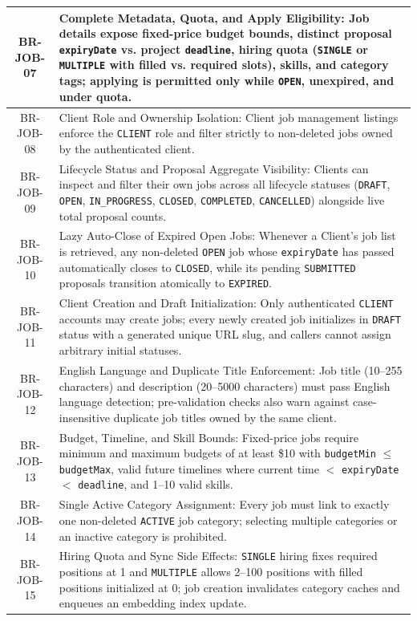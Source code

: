 \begin{longtable}{|c|p{12cm}|}
    BR-JOB-07 & Complete Metadata, Quota, and Apply Eligibility: Job details expose fixed-price budget bounds, distinct proposal \texttt{expiryDate} vs. project \texttt{deadline}, hiring quota (\texttt{SINGLE} or \texttt{MULTIPLE} with filled vs. required slots), skills, and category tags; applying is permitted only while \texttt{OPEN}, unexpired, and under quota. \\ \hline
    BR-JOB-08 & Client Role and Ownership Isolation: Client job management listings enforce the \texttt{CLIENT} role and filter strictly to non-deleted jobs owned by the authenticated client. \\ \hline
    BR-JOB-09 & Lifecycle Status and Proposal Aggregate Visibility: Clients can inspect and filter their own jobs across all lifecycle statuses (\texttt{DRAFT}, \texttt{OPEN}, \texttt{IN\_PROGRESS}, \texttt{CLOSED}, \texttt{COMPLETED}, \texttt{CANCELLED}) alongside live total proposal counts. \\ \hline
    BR-JOB-10 & Lazy Auto-Close of Expired Open Jobs: Whenever a Client's job list is retrieved, any non-deleted \texttt{OPEN} job whose \texttt{expiryDate} has passed automatically closes to \texttt{CLOSED}, while its pending \texttt{SUBMITTED} proposals transition atomically to \texttt{EXPIRED}. \\ \hline
    BR-JOB-11 & Client Creation and Draft Initialization: Only authenticated \texttt{CLIENT} accounts may create jobs; every newly created job initializes in \texttt{DRAFT} status with a generated unique URL slug, and callers cannot assign arbitrary initial statuses. \\ \hline
    BR-JOB-12 & English Language and Duplicate Title Enforcement: Job title (10--255 characters) and description (20--5000 characters) must pass English language detection; pre-validation checks also warn against case-insensitive duplicate job titles owned by the same client. \\ \hline
    BR-JOB-13 & Budget, Timeline, and Skill Bounds: Fixed-price jobs require minimum and maximum budgets of at least \$10 with \texttt{budgetMin} $\le$ \texttt{budgetMax}, valid future timelines where current time $<$ \texttt{expiryDate} $<$ \texttt{deadline}, and 1--10 valid skills. \\ \hline
    BR-JOB-14 & Single Active Category Assignment: Every job must link to exactly one non-deleted \texttt{ACTIVE} job category; selecting multiple categories or an inactive category is prohibited. \\ \hline
    BR-JOB-15 & Hiring Quota and Sync Side Effects: \texttt{SINGLE} hiring fixes required positions at 1 and \texttt{MULTIPLE} allows 2--100 positions with filled positions initialized at 0; job creation invalidates category caches and enqueues an embedding index update. \\ \hline

\end{longtable}
